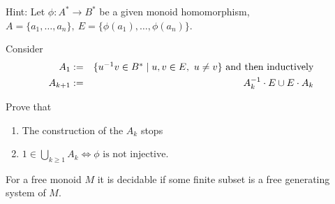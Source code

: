 Hint: Let $\phi: A^* \to B^*$ be a given monoid homomorphism, $A =
\{a_1,\ldots,a_n\},\ E = \{\phi(a_1),\ldots,\phi(a_n)\}$.

Consider
\begin{eqnarray*}
A_1 &:=& \mbox{$\{u^{-1} v \in B^* \mid u, v \in E,\ u\neq v \}$}\text{ and then
inductively}\\
A_{k+1} &:=& A_k^{-1} \cdot E \cup E \cdot A_k
\end{eqnarray*}

Prove that
\begin{enumerate}
  \item The construction of the $A_k$ stops
  \item $1 \in \bigcup_{k \geq 1} A_k \iff \phi\text{ is not injective}$.
\end{enumerate}


\begin{corollary}
For a free monoid $M$ it is decidable if some finite subset is a free generating
system of $M$.
\end{corollary}
